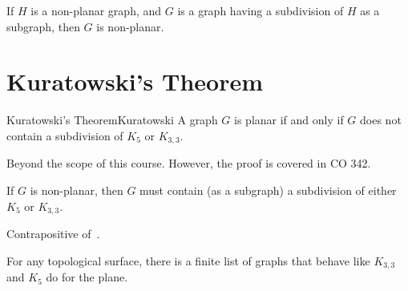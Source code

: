 \begin{Corollary}{}{}
    If $ H $ is a non-planar graph, and $ G $ is a graph
    having a subdivision of $ H $ as a subgraph, then $ G $
    is non-planar.
\end{Corollary}


\section{Kuratowski's Theorem}

\begin{Theorem}{Kuratowski's Theorem}{Kuratowski}
    A graph $ G $ is planar if and only if $ G $ does not
    contain a subdivision of $ K_5 $ or $ K_{3,3} $.
\end{Theorem}

\begin{Proof}{}{}
    Beyond the scope of this course. However, the proof is covered in
    CO 342.
\end{Proof}


\begin{Corollary}{}{}
    If $ G $ is non-planar, then $ G $ must contain
    (as a subgraph) a subdivision of either $ K_5 $ or $ K_{3,3} $.
\end{Corollary}

\begin{Proof}{}{}
    Contrapositive of~.
\end{Proof}


\begin{Theorem}{}{}
    For any topological surface, there is a finite list of graphs that behave
    like $ K_{3,3} $ and $ K_5 $ do for the plane.
\end{Theorem}

